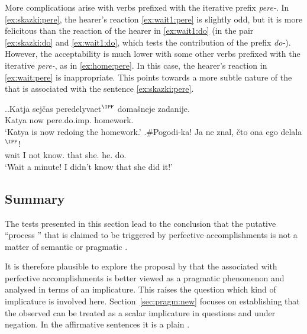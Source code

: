 More complications arise with verbs prefixed with the iterative prefix \textit{pere-}. In \ref{ex:skazki:pere}, the hearer's reaction \ref{ex:wait1:pere} is slightly odd, but it is more felicitous than the reaction of the hearer in \ref{ex:wait1:do} (in the pair \ref{ex:skazki:do} and \ref{ex:wait1:do}, which tests the contribution of the prefix \textit{do-}). However, the acceptability is much lower with some other verbs prefixed with the iterative \textit{pere-}, as in \ref{ex:home:pere}. In this case, the hearer's reaction in \ref{ex:wait:pere} is inappropriate. This points towards a more subtle nature of the  that is associated with the sentence \ref{ex:skazki:pere}.

\ex.\ag.\label{ex:home:pere}Katja sej\v{c}as peredelyvaet$^{\IPF}$ {doma\v{s}neje zadanije}.\\
Katya now pere.do.imp. homework.\\
\trans `Katya is now redoing the homework.'
\bg.\#Pogodi-ka! Ja ne znal, \v{c}to ona ego delala$^{\IPF}$!\label{ex:wait:pere}\\
wait I not know. that she. he. do.\\
\trans `Wait a minute! I didn't know that she did it!'

\subsection{Summary}
The tests presented in this section lead to the conclusion that the putative ``process '' that is claimed to be triggered by perfective accomplishments is not a matter of semantic or pragmatic .

It is therefore plausible to explore the proposal by \citet{Gronn:04, Gronn:06} that the  associated with perfective accomplishments is better viewed as a pragmatic phenomenon and analysed in terms of an implicature.
This raises the question which kind of implicature is involved here. Section~\ref{sec:pragm:new} focuses on establishing that the observed  can be treated as a scalar implicature in questions and under negation. In the affirmative sentences it is a plain .

